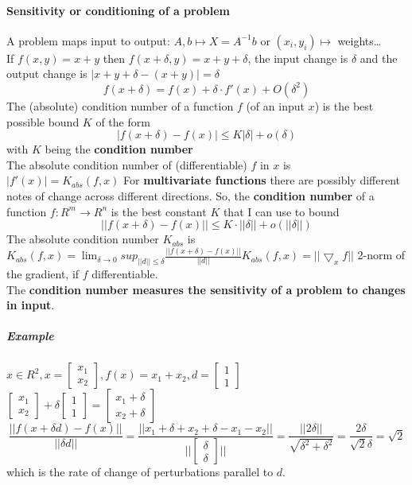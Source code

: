 \documentclass[10pt]{report}
\begin{document}
\paragraph{Sensitivity or conditioning of a problem} A problem maps input to output: $A,b\mapsto X=A^{-1}b$ or $(x_i,y_i)\mapsto$ weights\ldots\\
If $f(x,y) = x+y$ then $f(x+\delta, y) = x+y+\delta$, the input change is $\delta$ and the output change is $|x+y+\delta - (x+y)| = \delta$
$$f(x+\delta) = f(x)+\delta\cdot f'(x) + O(\delta^2)$$
The (absolute) condition number of a function $f$ (of an input $x$) is the best possible bound $K$ of the form
$$|f(x+\delta)-f(x)|\leq K|\delta| + o(\delta)$$ with $K$ being the \textbf{condition number}\\
The absolute condition number of (differentiable) $f$ in $x$ is $|f'(x)| = K_{abs}(f,x)$
For \textbf{multivariate functions} there are possibly different notes of change across different directions. So, the \textbf{condition number} of a function $f:R^m\rightarrow R^n$ is the best constant $K$ that I can use to bound $$||f(x+\delta)-f(x)|| \leq K\cdot||\delta|| + o(||\delta||)$$
The absolute condition number $K_{abs}$ is $K_{abs}(f,x) = \lim_{\delta\to 0} sup_{||d||\leq \delta}\frac{||f(x+\delta)-f(x)||}{||d||}$$ $$K_{abs}(f,x) = ||\bigtriangledown_x f||$ 2-norm of the gradient, if $f$ differentiable.\\
The \textbf{condition number measures the sensitivity of a problem to changes in input}.
\subparagraph{Example} $x\in R^2, x=\left[\begin{array}{c}
x_1\\x_2
\end{array}\right], f(x) = x_1 + x_2, d = \left[\begin{array}{c}
1\\1
\end{array}\right]$\\
$\left[\begin{array}{c}
x_1\\x_2
\end{array}\right] + \delta\left[\begin{array}{c}
1\\1
\end{array}\right] = \left[\begin{array}{c}
x_1+\delta\\x_2+\delta
\end{array}\right]$
$$\frac{||f(x+\delta d) - f(x)||}{||\delta d||} = \frac{||x_1+\delta+x_2+\delta-x_1-x_2||}{|| \left[\begin{array}{c}
\delta\\\delta
\end{array}\right]||} = \frac{||2\delta||}{\sqrt{\delta^2 + \delta^2}} = \frac{2\delta}{\sqrt{2}\delta} = \sqrt{2}$$ which is the rate of change of perturbations parallel to $d$.\\
\end{document}
